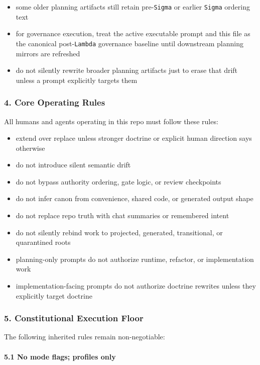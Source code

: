 \documentclass[9pt,a4paper,openany]{book}
\begin{document}
\begin{itemize}
\item some older planning artifacts still retain pre-\allowbreak{}\texttt{Sigma} or earlier \texttt{Sigma} ordering text
\item for governance execution, treat the active executable prompt and this file as the canonical post-\allowbreak{}\texttt{Lambda} governance baseline until downstream planning mirrors are refreshed
\item do not silently rewrite broader planning artifacts just to erase that drift unless a prompt explicitly targets them
\end{itemize}

\subsubsection{4. Core Operating Rules}

All humans and agents operating in this repo must follow these rules:


\begin{itemize}
\item extend over replace unless stronger doctrine or explicit human direction says otherwise
\item do not introduce silent semantic drift
\item do not bypass authority ordering, gate logic, or review checkpoints
\item do not infer canon from convenience, shared code, or generated output shape
\item do not replace repo truth with chat summaries or remembered intent
\item do not silently rebind work to projected, generated, transitional, or quarantined roots
\item planning-\allowbreak{}only prompts do not authorize runtime, refactor, or implementation work
\item implementation-\allowbreak{}facing prompts do not authorize doctrine rewrites unless they explicitly target doctrine
\end{itemize}

\subsubsection{5. Constitutional Execution Floor}

The following inherited rules remain non-\allowbreak{}negotiable:


\paragraph{5.1 No mode flags; profiles only}
\end{document}
